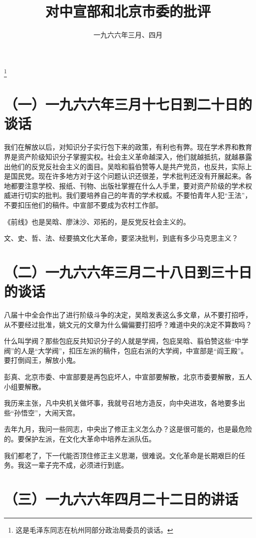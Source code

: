 
\title{对中宣部和北京市委的批评}
\date{一九六六年三月、四月}
\thanks{这是毛泽东同志在杭州同部分政治局委员的谈话。}
\maketitle


\section*{（一）一九六六年三月十七日到二十日的谈话}

我们在解放以后，对知识分子实行包下来的政策，有利也有弊。现在学术界和教育界是资产阶级知识分子掌握实权。社会主义革命越深入，他们就越抵抗，就越暴露出他们的反党反社会主义的面目。吴晗和翦伯赞等人是共产党员，也反共，实际上是国民党。现在许多地方对于这个问题认识还很差，学术批判还没有开展起来。各地都要注意学校、报纸、刊物、出版社掌握在什么人手里，要对资产阶级的学术权威进行切实的批判。我们要培养自己的年青的学术权威。不要怕青年人犯“王法”，不要扣压他们的稿件。中宣部不要成为农村工作部。

《前线》也是吴晗、廖沬沙、邓拓的，是反党反社会主义的。

文、史、哲、法、经要搞文化大革命，要坚决批判，到底有多少马克思主义？

\section*{（二）一九六六年三月二十八日到三十日的谈话}

八届十中全会作出了进行阶级斗争的决定，吴晗发表这么多文章，从不要打招呼，从不要经过批准，姚文元的文章为什么偏偏要打招呼？难道中央的决定不算数吗？

什么叫学阀？那些包庇反共知识分子的人就是学阀，包庇吴晗、翦伯赞这些“中学阀”的人是“大学阀”，扣压左派的稿件，包庇右派的大学阀，中宣部是“阎王殿”。要打倒阎王，解放小鬼。

彭真、北京市委、中宣部要是再包庇坏人，中宣部要解散，北京市委要解散，五人小组要解散。

我历来主张，凡中央机关做坏事，我就号召地方造反，向中央进攻，各地要多出些“孙悟空”，大闹天宫。

去年九月，我问一些同志，中央出了修正主义怎么办？这是很可能的，也是最危险的。要保护左派，在文化大革命中培养左派队伍。

我们都老了，下一代能否顶住修正主义思潮，很难说。文化革命是长期艰巨的任务。我这一辈子完不成，必须进行到底。

\section*{（三）一九六六年四月二十二日的讲话}


